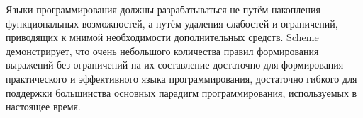 
\label{historysection}

Языки программирования должны разрабатываться не путём накопления функциональных возможностей, а
путём удаления слабостей и ограничений, приводящих к мнимой необходимости дополнительных
средств. Scheme демонстрирует, что очень небольшого количества правил формирования выражений
без ограничений на их составление достаточно для формирования практического и эффективного языка
программирования, достаточно гибкого для поддержки большинства основных парадигм
программирования, используемых в настоящее время.

